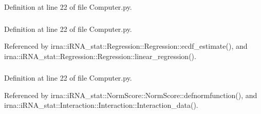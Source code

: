 \-Definition at line 22 of file \-Computer.\-py.

\hypertarget{classirna_1_1iRNA__stat_1_1Computer_1_1Computer_a513f09e859c15753e8d74105eca0ae53}{
\subsubsection[{s\-R\-N\-Aid\-\_\-tab}]{}}
\label{classirna_1_1iRNA__stat_1_1Computer_1_1Computer_a513f09e859c15753e8d74105eca0ae53}


\-Definition at line 22 of file \-Computer.\-py.



\-Referenced by irna\-::i\-R\-N\-A\-\_\-stat\-::\-Regression\-::\-Regression\-::ecdf\-\_\-estimate(), and irna\-::i\-R\-N\-A\-\_\-stat\-::\-Regression\-::\-Regression\-::linear\-\_\-regression().

\hypertarget{classirna_1_1iRNA__stat_1_1Computer_1_1Computer_a334e80f1765d3401c6cf8ae70260e09b}{
\subsubsection[{type\-\_\-sol}]{}}
\label{classirna_1_1iRNA__stat_1_1Computer_1_1Computer_a334e80f1765d3401c6cf8ae70260e09b}


\-Definition at line 22 of file \-Computer.\-py.



\-Referenced by irna\-::i\-R\-N\-A\-\_\-stat\-::\-Norm\-Score\-::\-Norm\-Score\-::defnormfunction(), and irna\-::i\-R\-N\-A\-\_\-stat\-::\-Interaction\-::\-Interaction\-::\-Interaction\-\_\-data().

